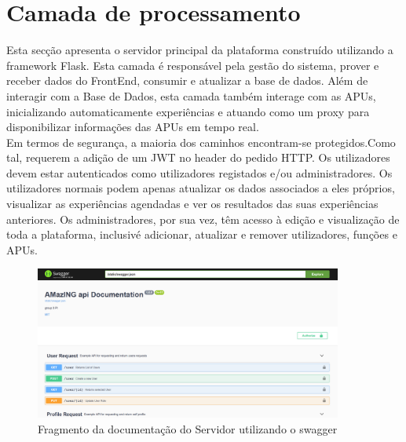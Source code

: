\section{Camada de processamento}
Esta secção apresenta o servidor principal da plataforma construído utilizando a framework Flask. Esta camada é responsável pela gestão do sistema, prover e receber dados do FrontEnd, consumir e atualizar a base de dados. Além de interagir com a Base de Dados, esta camada também interage com as APUs, inicializando automaticamente experiências e atuando como um proxy para disponibilizar informações das APUs em tempo real.\newline\\
Em termos de segurança, a maioria dos caminhos encontram-se protegidos.Como tal, requerem a adição de um JWT no header do pedido HTTP. Os utilizadores devem estar autenticados como utilizadores registados e/ou administradores. Os utilizadores normais podem apenas atualizar os dados associados a eles próprios, visualizar as experiências agendadas e ver os resultados das suas experiências anteriores. Os administradores, por sua vez, têm acesso à edição e visualização de toda a plataforma, inclusivé adicionar, atualizar e remover utilizadores, funções e APUs.
\newpage
\begin{figure}[!ht]
    \centering
    \includegraphics[width=0.9\textwidth]{images/swagger.png}
    \caption{Fragmento da documentação do Servidor utilizando o swagger}
    \label{fig:swagger}
\end{figure}

